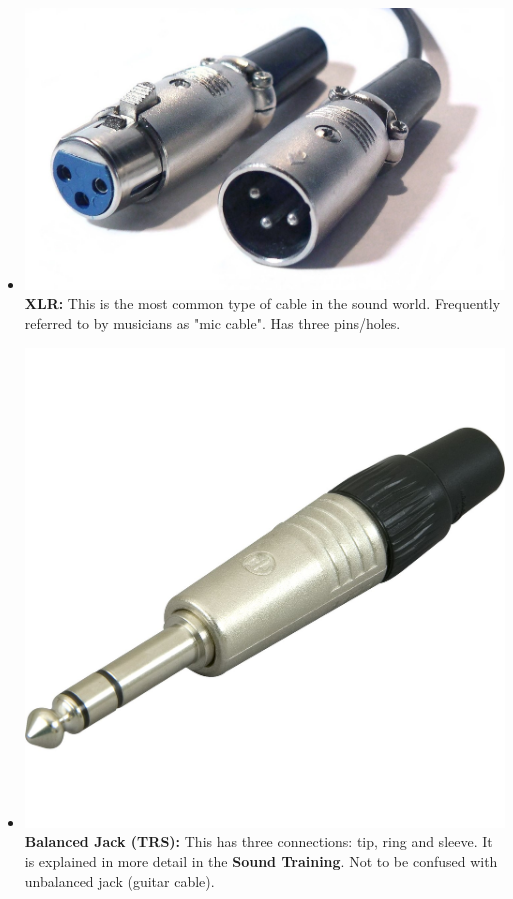 \documentclass[14pt,twocolumn]{extarticle} %
\begin{document}
\begin{itemize}

\item \includegraphics[scale=0.12]{xlr2.jpg}\textbf{XLR:} This is the most common type of cable in the sound world. Frequently referred to by musicians as "mic cable". Has three pins/holes.

\item \includegraphics[scale=0.35]{bal_jack.jpg}\textbf{Balanced Jack (TRS):} This has three connections: tip, ring and sleeve. It is explained in more detail in the \textbf{Sound Training}. Not to be confused with unbalanced jack (guitar cable).

\end{itemize}
\end{document}
